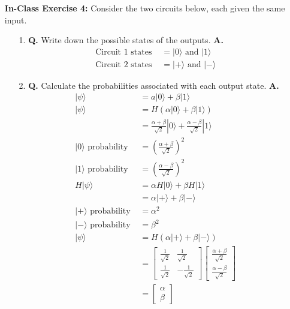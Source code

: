 \documentclass[main.tex]{subfiles}
\begin{document}
\begin{enumerate}
\item[] \textbf{In-Class Exercise 4:} Consider the two circuits below, each given the same input.

    \begin{enumerate}
        \item[1.] \textbf{Q.} Write down the possible states of the outputs. \textbf{A.}
            \begin{align*}
                \text{Circuit 1 states } & = |0\rangle \text{ and } |1\rangle\\
                \text{Circuit 2 states } & = |+\rangle \text{ and } |-\rangle
            \end{align*}
        \item[2.] \textbf{Q.} Calculate the probabilities associated with each output state. \textbf{A.}
            \begin{align*}
                |\psi\rangle                    & = a|0\rangle+\beta|1\rangle\\
                |\psi\rangle                    & = H \left( \alpha | 0 \rangle + \beta | 1 \rangle \right) \\
                                                & = \frac{\alpha+\beta}{\sqrt{2}}|0\rangle+\frac{\alpha-\beta}{\sqrt{2}}|1\rangle \\
                |0\rangle \text{ probability }  & = \left(\frac{\alpha+\beta}{\sqrt{2}}\right)^{2}\\
                |1\rangle \text{ probability }  & = \left(\frac{\alpha-\beta}{\sqrt{2}}\right)^{2}\\
                H | \psi \rangle                & = \alpha H | 0 \rangle + \beta H | 1 \rangle \\
                                                & = \alpha | + \rangle + \beta | - \rangle\\
                |+\rangle \text{ probability }  & = \alpha^2\\
                |-\rangle \text{ probability }  & = \beta^2\\
                |\psi\rangle                    & = H \left( \alpha | + \rangle + \beta | - \rangle \right)\\
                                                & = \left[\begin{array}{ll} \frac{1}{\sqrt{2}} & \frac{1}{\sqrt{2}} \\ \frac{1}{\sqrt{2}} & -\frac{1}{\sqrt{2}} \end{array}\right] \left[\begin{array}{l} \frac{\alpha + \beta}{\sqrt{2}} \\ \frac{\alpha - \beta}{\sqrt{2}} \end{array} \right]\\
                                                & = \left[\begin{array}{l} \alpha \\ \beta \end{array} \right]
            \end{align*}
    \end{enumerate}


\end{enumerate}
\end{document}

